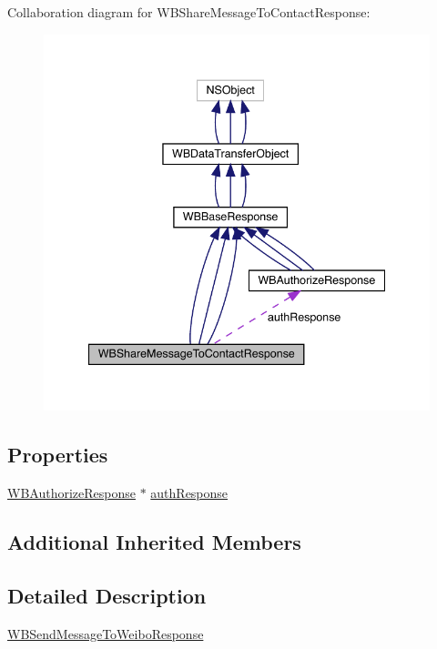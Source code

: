 Collaboration diagram for W\+B\+Share\+Message\+To\+Contact\+Response\+:\nopagebreak
\begin{figure}[H]
\begin{center}
\leavevmode
\includegraphics[width=340pt]{interface_w_b_share_message_to_contact_response__coll__graph}
\end{center}
\end{figure}
\subsection*{Properties}
\begin{DoxyCompactItemize}
\item 
\mbox{\hyperlink{interface_w_b_authorize_response}{W\+B\+Authorize\+Response}} $\ast$ \mbox{\hyperlink{interface_w_b_share_message_to_contact_response_a896701421a502274b0ebdea976f90c13}{auth\+Response}}
\end{DoxyCompactItemize}
\subsection*{Additional Inherited Members}


\subsection{Detailed Description}
\mbox{\hyperlink{interface_w_b_send_message_to_weibo_response}{W\+B\+Send\+Message\+To\+Weibo\+Response}} 

